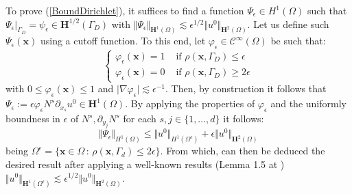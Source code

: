 To prove (\ref{BoundDirichlet}), it suffices to find a function $\Psi_{\epsilon} \in H^1(\Omega)$ such that $\Psi_{\epsilon} \vert_{\Gamma_D} = \psi_{\epsilon} \in \mathbf{H}^{1/2}(\Gamma_D)$ with $\Vert \Psi_{\epsilon} \Vert_{\mathbf{H}^1(\Omega)} \lesssim \epsilon^{1/2} \Vert u^0 \Vert_{\mathbf{H}^2(\Omega)}$.
Let us define such $\Psi_{\epsilon}(\mathbf{x})$ using a cutoff function. To this end, let $\varphi_{\epsilon} \in \mathcal{C}^{\infty}(\Omega)$ be such that:
\begin{equation*}
    \left \{
    \begin{aligned}
    \varphi_{\epsilon}(\mathbf{x}) = 1 & \text{ if } \rho(\mathbf{x}, \Gamma_D) \leq \epsilon \\
    \varphi_{\epsilon}(\mathbf{x}) = 0 & \text{ if } \rho(\mathbf{x}, \Gamma_D) \geq 2\epsilon 
    \end{aligned}
    \right.
\end{equation*}
with $0 \leq \varphi_{\epsilon}(\mathbf{x}) \leq 1$ and $\vert \nabla \varphi_{\epsilon} \vert \lesssim \epsilon^{-1}$.
Then, by construction it follows that $\Psi_{\epsilon} := \epsilon \varphi_{\epsilon} N^s \partial_{x_s}u^0 \in \mathbf{H}^1(\Omega)$.
By applying the properties of $\varphi_{\epsilon}$ and the uniformly boundness in $\epsilon$ of $N^s, \partial_{y_j} N^s$ for each $s,j \in \{1,\dots, d\}$ it follows:
\begin{equation*}
    \Vert \Psi_{\epsilon} \Vert_{H^1(\Omega)} \leq \Vert u^0 \Vert_{H^1(\Omega^{\epsilon})} + \epsilon \Vert u^0 \Vert_{\mathbf{H}^2(\Omega)}
\end{equation*}
being $\Omega^{\epsilon} = \{\mathbf{x}\in \Omega \, :\, \rho(\mathbf{x},\Gamma_d) \leq 2\epsilon \}$. From which, can then be deduced the desired result after applying a well-known results (Lemma 1.5 at \cite{oleinik1992mathematical}) $\Vert u^0 \Vert_{\mathbf{H}^1(\Omega^{\epsilon})} \lesssim \epsilon^{1/2} \Vert u^0 \Vert_{\mathbf{H}^2(\Omega)}$.

